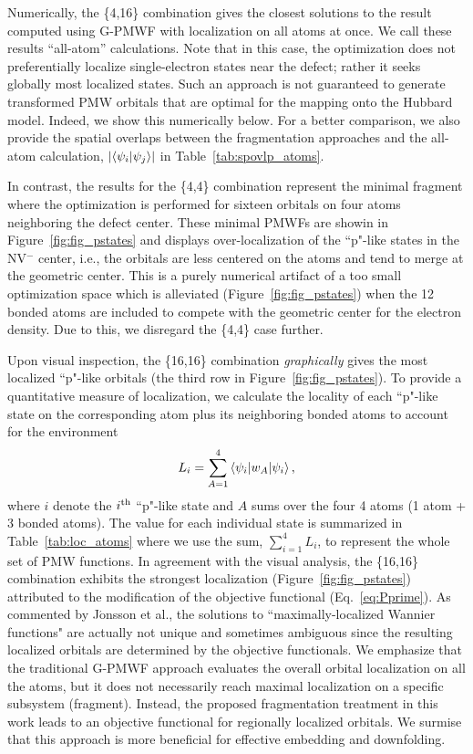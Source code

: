 \documentclass[journal=jacsat,manuscript=article]{achemso}
\begin{document}
Numerically, the \{4,16\} combination gives the closest solutions to the result computed using G-PMWF with localization on all atoms at once. We call these results ``all-atom'' calculations. Note that in this case, the optimization does not preferentially localize single-electron states near the defect; rather it seeks globally most localized states. Such an approach is not guaranteed to generate transformed PMW orbitals that are optimal for the mapping onto the Hubbard model. Indeed, we show this numerically below. For a better comparison, we also provide the spatial overlaps between the fragmentation approaches and the all-atom calculation, $\lvert \braket{\psi_i | \psi_j} \rvert$ in Table~\ref{tab:spovlp_atoms}.

In contrast, the results for the \{4,4\} combination represent the minimal fragment where the optimization is performed for sixteen orbitals on four atoms neighboring the defect center. These minimal PMWFs are showin in Figure~\ref{fig:fig_pstates} and displays over-localization of the ``p"-like states in the NV$^-$ center, i.e., the orbitals are less centered on the atoms and tend to merge at the geometric center. This is a purely numerical artifact of a too small optimization space which is alleviated (Figure~\ref{fig:fig_pstates}) when the 12 bonded atoms are included to compete with the geometric center for the electron density. Due to this, we disregard the \{4,4\} case further. 

Upon visual inspection, the \{16,16\} combination \textit{graphically} gives the most localized ``p"-like orbitals (the third row in Figure~\ref{fig:fig_pstates}). To provide a quantitative measure of localization, we calculate the locality of each ``p"-like state on the corresponding atom plus its neighboring bonded atoms to account for the environment
\begin{equation}\label{eq:wflocality}
  L_i = \sum_{A=1}^{4}\braket{\psi_i | w_A |\psi_i},
\end{equation}
where $i$ denote the $i^{\rm th}$ ``p"-like state and $A$ sums over the four 4 atoms (1 atom + 3 bonded atoms). The value for each individual state is summarized in Table~\ref{tab:loc_atoms} where we use the sum, $\sum_{i=1}^4 L_i$, to represent the whole set of PMW functions. In agreement with the visual analysis, the \{16,16\} combination exhibits the strongest localization (Figure~\ref{fig:fig_pstates}) attributed to the modification of the objective functional (Eq.~\ref{eq:Pprime}). As commented by J$\acute{\text{o}}$nsson\cite{Jonsson2017} et al., the solutions to ``maximally-localized Wannier functions" are actually not unique and sometimes ambiguous since the resulting localized orbitals are determined by the objective functionals. We emphasize that the traditional G-PMWF approach evaluates the overall orbital localization on all the atoms, but it does not necessarily reach maximal localization on a specific subsystem (fragment). Instead, the proposed fragmentation treatment in this work leads to an objective functional for regionally localized orbitals. We surmise that this approach is more beneficial for effective embedding and downfolding.
\end{document}

